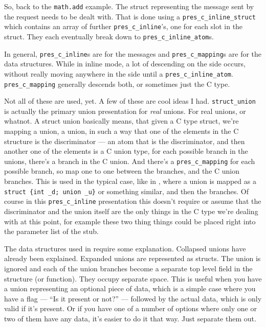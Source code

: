 So, back to the \texttt{math.add} example.  The \MINT{} struct representing the
message sent by the request needs to be dealt with.  That is done using a
\texttt{pres\_c\_inline\_struct} which contains an array of further
\texttt{pres\_c\_inline}'s, one for each slot in the \MINT{} struct.  They each
eventually break down to \texttt{pres\_c\_inline\_atom}s.

In general, \texttt{pres\_c\_inline}s are for the \MINT{} messages and
\texttt{pres\_c\_mapping}s are for the \CAST{} data structures.  While in inline
mode, a lot of descending on the \MINT{} side occurs, without really moving
anywhere in the \CAST{} side until a \texttt{pres\_c\_inline\_atom}.
\texttt{pres\_c\_mapping} generally descends both, or sometimes just the C
type.

Not all of these are used, yet.  A few of these are cool ideas I had.
\texttt{struct\_union} is actually the primary union presentation for
\emph{real} unions.  For real \CORBA{} unions, or whatnot.  A struct union
basically means, that given a C type struct, we're mapping a union, a \MINT{}
union, in such a way that one of the elements in the C structure is the
discriminator --- an atom that is the discriminator, and then another one of
the elements is a C union type, for each possible branch in the \MINT{} unions,
there's a branch in the C union.  And there's a \texttt{pres\_c\_mapping} for
each possible branch, so map one to one between the \MINT{} branches, and the C
union branches.  This is used in the typical case, like in \CORBA{}, where a union
is mapped as a \texttt{struct~\{int~\_d;~union~\_u\}} or something similar, and
then the branches.  Of course in this \texttt{pres\_c\_inline} presentation
this doesn't require or assume that the discriminator and the union itself are
the only things in the C type we're dealing with at this point, for example
these two thing things could be placed right into the parameter list of the
stub.

The data structures used in \PRESC{} require some explanation.  Collapsed
unions have already been explained.  Expanded unions are represented as
structs.  The union is ignored and each of the union branches become a separate
top level field in the structure (or function).  They occupy separate space.
This is useful when you have a union representing an optional piece of data,
which is a simple case where you have a flag --- ``Is it present or not?'' ---
followed by the actual data, which is only valid if it's present.  Or if you
have one of a number of options where only one or two of them have any data,
it's easier to do it that way.  Just separate them out.


